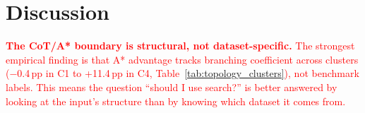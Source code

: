 \documentclass{article}
\begin{document}








\section{Discussion}
\label{sec:discussion}

\textcolor{red}{\textbf{The CoT/A* boundary is structural, not dataset-specific.}
The strongest empirical finding is that A* advantage tracks branching coefficient across clusters ($-$0.4\,pp in C1 to +11.4\,pp in C4, Table~\ref{tab:topology_clusters}), not benchmark labels. This means the question ``should I use search?'' is better answered by looking at the input's structure than by knowing which dataset it comes from.}
\end{document}
